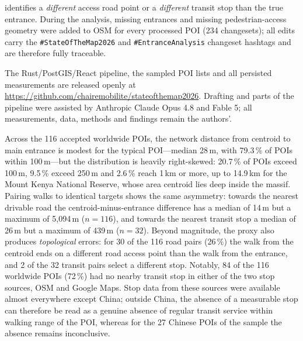 \documentclass{osmscience}
\begin{document}
identifies a \emph{different} access road point or a \emph{different} transit stop than the true entrance. During the analysis, missing entrances and missing pedestrian-access geometry were added to OSM for every processed POI (234 changesets); all edits carry the \texttt{\#StateOfTheMap2026} and \texttt{\#EntranceAnalysis} changeset hashtags and are therefore fully traceable.

The Rust/PostGIS/React pipeline, the sampled POI lists and all persisted measurements are released openly at \url{https://github.com/chairemobilite/stateofthemap2026}. Drafting and parts of the pipeline were assisted by Anthropic Claude Opus 4.8 and Fable 5; all measurements, data, methods and findings remain the authors'.

Across the 116 accepted worldwide POIs, the network distance from centroid to main entrance is modest for the typical POI---median 28\,m, with 79.3\,\% of POIs within 100\,m---but the distribution is heavily right-skewed: 20.7\,\% of POIs exceed 100\,m, 9.5\,\% exceed 250\,m and 2.6\,\% reach 1\,km or more, up to 14.9\,km for the Mount Kenya National Reserve, whose area centroid lies deep inside the massif. Pairing walks to identical targets shows the same asymmetry: towards the nearest drivable road the centroid-minus-entrance difference has a median of 14\,m but a maximum of 5{,}094\,m ($n=116$), and towards the nearest transit stop a median of 26\,m but a maximum of 439\,m ($n=32$). Beyond magnitude, the proxy also produces \emph{topological} errors: for 30 of the 116 road pairs (26\,\%) the walk from the centroid ends on a different road access point than the walk from the entrance, and 2 of the 32 transit pairs select a different stop. Notably, 84 of the 116 worldwide POIs (72\,\%) had no nearby transit stop in either of the two stop sources, OSM and Google Maps. Stop data from these sources were available almost everywhere except China; outside China, the absence of a measurable stop can therefore be read as a genuine absence of regular transit service within walking range of the POI, whereas for the 27 Chinese POIs of the sample the absence remains inconclusive.
\end{document}
